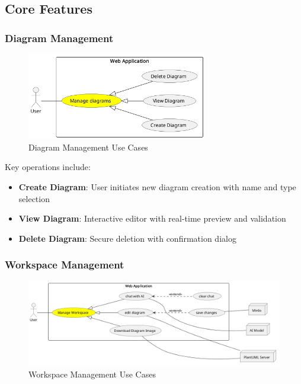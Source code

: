 \subsection{Core Features}

\subsubsection{Diagram Management}
\begin{figure}[H]
\centering
\includegraphics[width=0.7\textwidth]{conception/SprintIV/use_case_diagrams/refined_use_case_feature_diagram_management.png}
\caption{Diagram Management Use Cases}
\end{figure}

Key operations include:
\begin{itemize}
    \item \textbf{Create Diagram}: User initiates new diagram creation with name and type selection
    \item \textbf{View Diagram}: Interactive editor with real-time preview and validation
    \item \textbf{Delete Diagram}: Secure deletion with confirmation dialog
\end{itemize}

\subsubsection{Workspace Management}
\begin{figure}[H]
\centering
\includegraphics[width=1\textwidth]{conception/SprintIV/use_case_diagrams/refined_use_case_feature_workspace_management.png}
\caption{Workspace Management Use Cases}
\end{figure}

